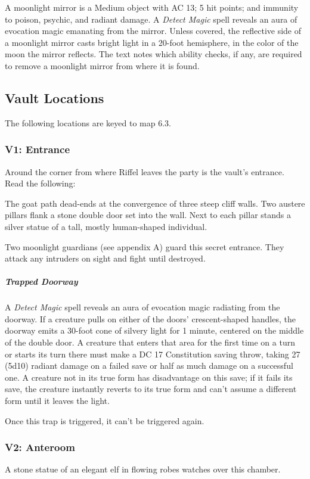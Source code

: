 \documentclass[10pt,a4paper,twoside,bg=print,twocolumn,openany,nodeprecatedcode]{dndbook}
\begin{document}
A moonlight mirror is a Medium object with AC 13; 5 hit points; and immunity to poison, psychic, and radiant damage. A \textit{Detect Magic} spell reveals an aura of evocation magic emanating from the mirror. Unless covered, the reflective side of a moonlight mirror casts bright light in a 20-foot hemisphere, in the color of the moon the mirror reflects. The text notes which ability checks, if any, are required to remove a moonlight mirror from where it is found.

\subsection{Vault Locations}
The following locations are keyed to map 6.3.

\subsubsection{V1: Entrance}
Around the corner from where Riffel leaves the party is the vault's entrance. Read the following:

\begin{DndReadAloud}{}
The goat path dead-ends at the convergence of three steep cliff walls. Two austere pillars flank a stone double door set into the wall. Next to each pillar stands a silver statue of a tall, mostly human-shaped individual.

\end{DndReadAloud}

Two moonlight guardians (see appendix A) guard this secret entrance. They attack any intruders on sight and fight until destroyed.

\subparagraph{Trapped Doorway}
A \textit{Detect Magic} spell reveals an aura of evocation magic radiating from the doorway. If a creature pulls on either of the doors' crescent-shaped handles, the doorway emits a 30-foot cone of silvery light for 1 minute, centered on the middle of the double door. A creature that enters that area for the first time on a turn or starts its turn there must make a DC 17 Constitution saving throw, taking 27 (5d10) radiant damage on a failed save or half as much damage on a successful one. A creature not in its true form has disadvantage on this save; if it fails its save, the creature instantly reverts to its true form and can't assume a different form until it leaves the light.

Once this trap is triggered, it can't be triggered again.

\subsubsection{V2: Anteroom}
\begin{DndReadAloud}{}
A stone statue of an elegant elf in flowing robes watches over this chamber.

\end{DndReadAloud}
\end{document}
